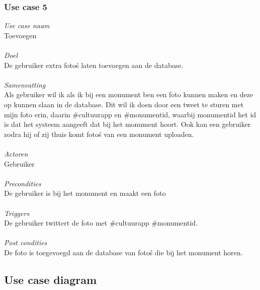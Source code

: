 \documentclass[a4paper,10pt]{article}
\begin{document}
			\subsubsection{Use case 5}
			\textit{Use case naam}\\
			Toevoegen\\ \\
			\textit{Doel}\\
			De gebruiker extra foto\'s laten toevoegen aan de database.\\ \\
			\textit{Samenvatting}\\
			Als gebruiker wil ik als ik bij een monument ben een foto kunnen maken en deze op kunnen slaan in de database. Dit wil ik doen door een tweet te sturen met mijn foto erin, daarin \#cultuurapp en \#monumentid, waarbij monumentid het id is dat het systeem aangeeft dat bij het monument hoort. Ook kan een gebruiker zodra hij of zij thuis komt foto\'s van een monument uploaden.\\ \\
			\textit{Actoren}\\
			Gebruiker\\ \\
			\textit{Precondities}\\
			De gebruiker is bij het monument en maakt een foto\\ \\
			\textit{Triggers}\\
			De gebruiker twittert de foto met \#cultuurapp \#monumentid.\\ \\
			\textit{Post condities}\\
			De foto is toegevoegd aan de database van foto\'s die bij het monument horen.

	\subsection{Use case diagram}
	
	\clearpage
\end{document}
